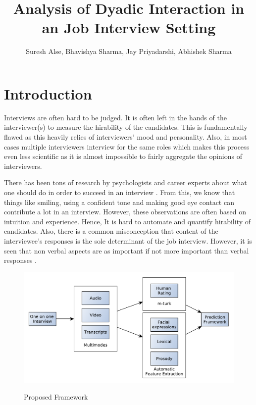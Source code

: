 \documentclass[11pt]{article}
\begin{document}
\title{Analysis of Dyadic Interaction in an Job Interview Setting}

\author{Suresh Alse, Bhavishya Sharma, Jay Priyadarshi, Abhishek Sharma}

\maketitle




\nocite{*}
\section{Introduction}
Interviews are often hard to be judged. It is often left in the hands of the interviewer(s) to measure the hirability of the candidates. This is fundamentally flawed as this heavily relies of interviewers' mood and personality. Also, in most cases multiple interviewers interview for the same roles which makes this process even less scientific as it is almost impossible to fairly aggregate the opinions of interviewers.

There has been tons of research by psychologists and career experts about what one should do in order to succeed in an interview \cite{huffcutt2001identification}. From this, we know that things like smiling, using a confident tone and making good eye contact can contribute a lot in an interview. However, these observations are often based on intuition and experience. Hence, It is hard to automate and quantify hirability of candidates. Also, there is a common misconception that content of the interviewee's responses is the sole determinant of the job interview. However, it is seen that non verbal aspects are as important if not more important than verbal responses \cite{mehrabian1971silent}.

\begin{figure}[h!]
\begin{center}
\includegraphics[width=0.7\columnwidth]{figures/process1/process1}
\label{fig:process}
\caption{{Proposed Framework%
}}
\end{center}
\end{figure}
\end{document}
